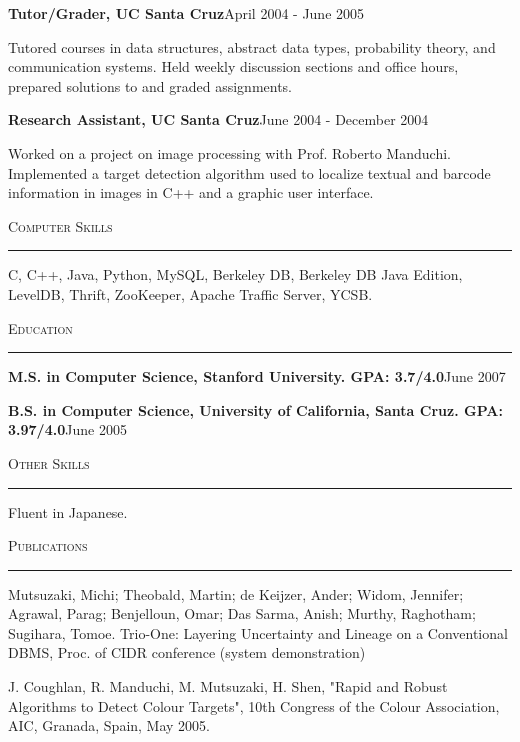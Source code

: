 \documentclass[10pt]{article}
\newcommand{\HRule}{\noindent\rule{\linewidth}{0.1mm}}
\newcommand{\header}[1]{\vspace{0.4cm}\noindent\textsc{\large{#1}}\vspace{-0.2cm}\newline\HRule}
\newcommand{\subheader}[2]{\noindent \textbf{#1}\hspace{\stretch{1}}#2}
\begin{document}
\vspace{0.2cm}

\subheader{Tutor/Grader, UC Santa Cruz}{April 2004 - June 2005}

\noindent
\begin{list}{}{\leftmargin=1em}
\item Tutored courses in data structures, abstract data types, probability
theory, and communication systems. Held weekly discussion sections and office
hours, prepared solutions to and graded assignments.
\end{list}
\vspace{0.2cm}

\subheader{Research Assistant, UC Santa Cruz}{June 2004 - December 2004}

\noindent
\begin{list}{}{\leftmargin=1em}
\item Worked on a project on image processing with Prof. Roberto Manduchi. 
Implemented a target detection algorithm used to localize textual and barcode
information in images in C++ and a graphic user interface.
\end{list}

\header{Computer Skills} 

\noindent
C, C++, Java, Python, MySQL, Berkeley DB, Berkeley DB Java Edition, LevelDB,
Thrift, ZooKeeper, Apache Traffic Server, YCSB.

\header{Education}
\subheader{M.S. in Computer Science, Stanford University. GPA: 3.7/4.0}{June 2007}

\subheader{B.S. in Computer Science, University of California, Santa Cruz. GPA: 3.97/4.0}{June 2005} 

\header{Other Skills}
Fluent in Japanese. 

\header{Publications}
\noindent
Mutsuzaki, Michi; Theobald, Martin; de Keijzer, Ander; Widom, Jennifer; 
Agrawal, Parag; Benjelloun, Omar; Das Sarma, Anish; Murthy, Raghotham; 
Sugihara, Tomoe. Trio-One: Layering Uncertainty and Lineage on a 
Conventional DBMS, Proc. of CIDR conference (system demonstration)
\newline

\noindent
J. Coughlan, R. Manduchi, M. Mutsuzaki, H. Shen, "Rapid and Robust
Algorithms to Detect Colour Targets", 10th Congress of the Colour 
Association, AIC, Granada, Spain, May 2005.
\end{document}
